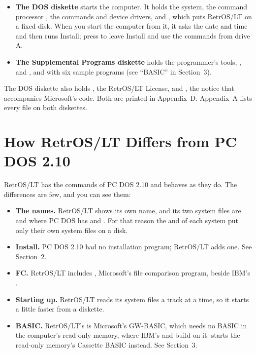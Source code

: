 \begin{itemize}
\item \textbf{The DOS diskette} starts the computer. It holds the system,
  the command processor , the commands and device
  drivers, and , which puts RetrOS/LT on a fixed disk. When
  you start the computer from it, it asks the date and time and then runs
  Install; press  to leave Install and use the commands from
  drive A.
\item \textbf{The Supplemental Programs diskette} holds the programmer's
  tools, ,  and , and
   with six sample programs (see ``BASIC'' in Section~3).
\end{itemize}

The DOS diskette also holds , the RetrOS/LT License,
and , the notice that accompanies Microsoft's code. Both
are printed in Appendix~D. Appendix~A lists every file on both diskettes.


\section{How RetrOS/LT Differs from PC DOS 2.10}

RetrOS/LT has the commands of PC DOS 2.10 and behaves as they do. The
differences are few, and you can see them:

\begin{itemize}
\item \textbf{The names.} RetrOS/LT shows its own name, and its two system
  files are  and  where PC DOS has
   and . For that reason the
   and  of each system put only their own system
  files on a disk.
\item \textbf{Install.} PC DOS 2.10 had no installation program; RetrOS/LT
  adds one. See Section~2.
\item \textbf{FC.} RetrOS/LT includes , Microsoft's file
  comparison program, beside IBM's .
\item \textbf{Starting up.} RetrOS/LT reads its system files a track at a
  time, so it starts a little faster from a diskette.
\item \textbf{BASIC.} RetrOS/LT's  is Microsoft's GW-BASIC,
  which needs no BASIC in the computer's read-only memory, where IBM's
   and  build on it.  starts
  the read-only memory's Cassette BASIC instead. See Section~3.
\end{itemize}

